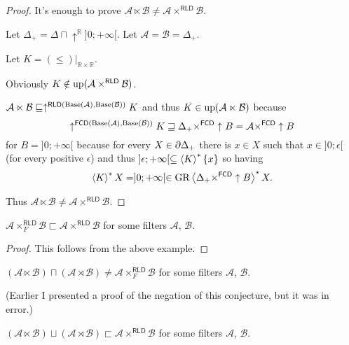 \begin{proof}
It's enough to prove $\mathcal{A}\ltimes\mathcal{B}\neq\mathcal{A}\times^{\mathsf{RLD}}\mathcal{B}$.

Let $\Delta_{+}=\Delta\sqcap\uparrow^{\mathbb{R}}]0;+\infty[$. Let
$\mathcal{A}=\mathcal{B}=\Delta_{+}$.

Let $K=(\le)|_{\mathbb{R}\times\mathbb{R}}$.

Obviously $K\notin\operatorname{up}(\mathcal{A}\times^{\mathsf{RLD}}\mathcal{B})$.

$\mathcal{A}\ltimes\mathcal{B}\sqsubseteq\uparrow^{\mathsf{RLD}(\operatorname{Base}(\mathcal{A}),\operatorname{Base}(\mathcal{B}))}K$
and thus $K\in\operatorname{up}(\mathcal{A}\ltimes\mathcal{B})$ because 
\[
\uparrow^{\mathsf{FCD}(\operatorname{Base}(\mathcal{A}),\operatorname{Base}(\mathcal{B}))}K\sqsupseteq\Delta_{+}\times^{\mathsf{FCD}}\uparrow B=\mathcal{A}\times^{\mathsf{FCD}}\uparrow B
\]
for $B=]0;+\infty[$
because for every $X\in\partial\Delta_{+}$ there is $x\in X$ such that $x\in]0;\epsilon[$ (for every positive $\epsilon$)
and thus $]\epsilon;+\infty[\subseteq\left\langle K\right\rangle ^{\ast}\{x\}$ so having
\[\left\langle K\right\rangle ^{\ast}X = ]0;+\infty[ \in \operatorname{GR}\left\langle \Delta_{+}\times^{\mathsf{FCD}}\uparrow B\right\rangle ^{\ast}X.\]

Thus $\mathcal{A}\ltimes\mathcal{B}\neq\mathcal{A}\times^{\mathsf{RLD}}\mathcal{B}$.\end{proof}
\begin{example}
\label{secprod-neq}$\mathcal{A}\times_{F}^{\mathsf{RLD}}\mathcal{B}\sqsubset\mathcal{A}\times^{\mathsf{RLD}}\mathcal{B}$
for some filters $\mathcal{A}$, $\mathcal{B}$.\end{example}
\begin{proof}
This follows from the above example.\end{proof}
\begin{conjecture}
$(\mathcal{A}\ltimes\mathcal{B})\sqcap(\mathcal{A}\rtimes\mathcal{B})\ne\mathcal{A}\times_{F}^{\mathsf{RLD}}\mathcal{B}$
for some filters $\mathcal{A}$, $\mathcal{B}$.\end{conjecture}
(Earlier I presented a proof of the negation of this conjecture, but it was in error.)
\begin{example}
$(\mathcal{A}\ltimes\mathcal{B})\sqcup(\mathcal{A}\rtimes\mathcal{B})\sqsubset\mathcal{A}\times^{\mathsf{RLD}}\mathcal{B}$
for some filters $\mathcal{A}$, $\mathcal{B}$.\end{example}
